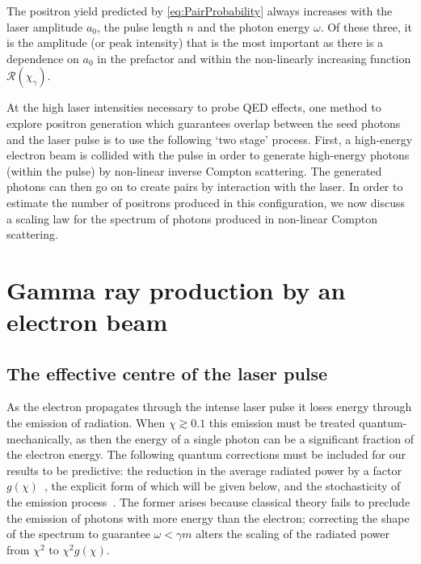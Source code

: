 \documentclass[reprint,superscriptaddress,amsmath,amssymb,aps,pra]{revtex4-1}
\newcommand{\aux}{\mathcal{R}}
\begin{document}
The positron yield predicted by \cref{eq:PairProbability} always increases with the laser
amplitude $a_0$, the pulse length $n$ and the photon energy $\omega$. Of these
three, it is the amplitude (or peak intensity) that is the most important
as there is a dependence on $a_0$ in the prefactor and within the non-linearly
increasing function $\aux(\chi_\gamma)$.

At the high laser intensities necessary to probe QED effects, one method to
explore positron generation which guarantees overlap between the seed photons
and the laser pulse is to use the following `two stage' process. First,
a high-energy electron beam is collided with the pulse in order to generate
high-energy photons (within the pulse) by non-linear inverse Compton scattering.
The generated photons can then go on to create pairs by interaction with the laser.
In order to estimate the number of positrons produced in this configuration,
we now discuss a scaling law for the spectrum of photons produced in
non-linear Compton scattering.

\section{Gamma ray production by an electron beam}
\label{sec:grp}

\subsection{The effective centre of the laser pulse}
\label{sec:phi_c}
As the electron propagates through the intense laser pulse it loses
energy through the emission of radiation. When $\chi \gtrsim 0.1$ this emission must be
treated quantum-mechanically, as then the energy
of a single photon can be a significant fraction of the electron
energy. The following quantum corrections must be included
for our results to be predictive: the reduction in the average radiated
power by a factor $g(\chi)$~\cite{SokolovTernov}, the explicit form of which
will be given below, and the stochasticity of the emission
process~\cite{ShenWhite,Duclous,Harvey}.
The former arises because classical theory fails to preclude the
emission of photons with more energy than the electron; correcting the shape
of the spectrum to guarantee $\omega < \gamma m$ alters the scaling of
the radiated power from $\chi^2$ to $\chi^2 g(\chi)$.
\end{document}
